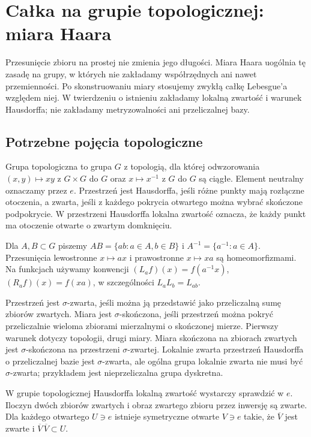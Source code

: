 \section{Całka na grupie topologicznej: miara Haara}
Przesunięcie zbioru na prostej nie zmienia jego długości. Miara Haara uogólnia tę zasadę na grupy, w których nie zakładamy współrzędnych ani nawet przemienności. Po skonstruowaniu miary stosujemy zwykłą całkę Lebesgue'a względem niej. W twierdzeniu o istnieniu zakładamy lokalną zwartość i warunek Hausdorffa; nie zakładamy metryzowalności ani przeliczalnej bazy.

\subsection*{Potrzebne pojęcia topologiczne}
\begin{definicja}
Grupa topologiczna to grupa $G$ z topologią, dla której odwzorowania $(x,y)\mapsto xy$ z $G\times G$ do $G$ oraz $x\mapsto x^{-1}$ z $G$ do $G$ są ciągłe. Element neutralny oznaczamy przez $e$. Przestrzeń jest Hausdorffa, jeśli różne punkty mają rozłączne otoczenia, a zwarta, jeśli z każdego pokrycia otwartego można wybrać skończone podpokrycie. W przestrzeni Hausdorffa lokalna zwartość oznacza, że każdy punkt ma otoczenie otwarte o zwartym domknięciu.
\end{definicja}
Dla $A,B\subset G$ piszemy $AB=\{ab:a\in A,b\in B\}$ i $A^{-1}=\{a^{-1}:a\in A\}$. Przesunięcia lewostronne $x\mapsto ax$ i prawostronne $x\mapsto xa$ są homeomorfizmami. Na funkcjach używamy konwencji $(L_af)(x)=f(a^{-1}x)$, $(R_af)(x)=f(xa)$, w szczególności $L_aL_b=L_{ab}$.
\begin{uwaga}
Przestrzeń jest $\sigma$-zwarta, jeśli można ją przedstawić jako przeliczalną sumę zbiorów zwartych. Miara jest $\sigma$-skończona, jeśli przestrzeń można pokryć przeliczalnie wieloma zbiorami mierzalnymi o skończonej mierze. Pierwszy warunek dotyczy topologii, drugi miary. Miara skończona na zbiorach zwartych jest $\sigma$-skończona na przestrzeni $\sigma$-zwartej. Lokalnie zwarta przestrzeń Hausdorffa o przeliczalnej bazie jest $\sigma$-zwarta, ale ogólna grupa lokalnie zwarta nie musi być $\sigma$-zwarta; przykładem jest nieprzeliczalna grupa dyskretna.
\end{uwaga}
\begin{lemat}
W grupie topologicznej Hausdorffa lokalną zwartość wystarczy sprawdzić w $e$. Iloczyn dwóch zbiorów zwartych i obraz zwartego zbioru przez inwersję są zwarte. Dla każdego otwartego $U\ni e$ istnieje symetryczne otwarte $V\ni e$ takie, że $\overline V$ jest zwarte i $\overline V\,\overline V\subset U$.
\end{lemat}
